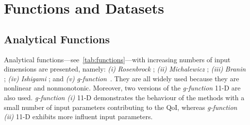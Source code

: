 
\chapter{Functions and Datasets}

\section{Analytical Functions}
\label{sec:functions}

Analytical functions---see~\cref{tab:functions}---with increasing numbers of input dimensions are presented, namely: \textit{(i)} \textit{Rosenbrock} ; \textit{(ii)} \textit{Michalewicz} ; \textit{(iii)} \textit{Branin} ; \textit{(iv)} \textit{Ishigami} ; and \textit{(v)} \textit{g-function}~\cite{molga2005,ishigami1990,Saltelli2007,legratiet2016,forrester2008a}. They are all widely used because they are nonlinear and nonmonotonic. Moreover, two versions of the \emph{g-function} 11-D are also used. \textit{g-function (i)} 11-D demonstrates the behaviour of the methods with a small number of input parameters contributing to the QoI, whereas \textit{g-function (ii)} 11-D exhibits more influent input parameters.

